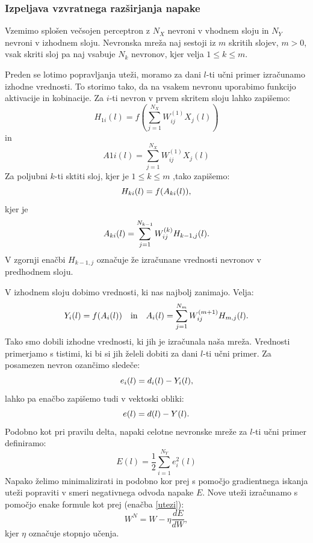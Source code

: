 \documentclass[mat1]{fmfdelo}
\begin{document}
\subsubsection{Izpeljava vzvratnega razširjanja napake}
Vzemimo splošen večsojen perceptron z $N_X$ nevroni v vhodnem sloju in $N_Y$ nevroni v izhodnem sloju. Nevronska mreža naj sestoji iz $m$ skritih slojev, $m>0$, vsak skriti sloj pa naj vsabuje $N_k$ nevronov, kjer velja $1\leq k \leq m$. 

Preden se lotimo popravljanja uteži, moramo za dani $l$-ti učni primer izračunamo izhodne vrednosti. To storimo tako, da na vsakem nevronu uporabimo funkcijo aktivacije in kobinacije. Za $i$-ti nevron v prvem skritem sloju lahko zapišemo:
%
\begin{equation*}
H_{1i}(l) = f\left( \sum^{N_X}_{j=1}{W^{(1)}_{ij}X_j(l)}\right)
\end{equation*}
%
in
%
\begin{equation*}
A{1i}(l) =\sum^{N_X}_{j=1}{W^{(1)}_{ij}X_j(l)}
\end{equation*}
%
Za poljubni $k$-ti sktiti sloj, kjer je $1\leq k \leq m$ ,tako zapišemo:
%
\begin{equation*}
H_{ki}(l) = f(A_{ki}(l))\text,
\end{equation*}
%
kjer je
%
\begin{equation*}
A_{ki}(l) = \sum^{N_{k-1}}_{j=1}W^{(k)}_{ij}H_{k-1,j}(l)\text.
\end{equation*}
%
V zgornji enačbi $H_{k-1,j}$ označuje že izračunane vrednosti nevronov v predhodnem sloju.
 
 V izhodnem sloju dobimo vrednosti, ki nas najbolj zanimajo. Velja:
%
\begin{equation*}
Y_{i}(l) = f(A_{i}(l)) \quad \text{in} \quad A_{i}(l) = \sum^{N_{m}}_{j=1}{W^{(m+1)}_{ij}H_{m,j}(l)}\text.
\end{equation*}
%
Tako smo dobili izhodne vrednosti, ki jih je izračunala naša mreža. Vrednosti primerjamo s tistimi, ki bi si jih želeli dobiti za dani $l$-ti učni primer. Za posamezen nevron ozančimo sledeče:
%
\begin{equation}
e_i(l) = d_i(l) - Y_i(l)\text,
\end{equation}
lahko pa enačbo zapišemo tudi v vektoski obliki:
\begin{equation*}
e(l) = d(l) - Y(l)\text.
\end{equation*}
Podobno kot pri pravilu delta, napaki celotne nevronske mreže za $l$-ti učni primer definiramo:
%
\begin{equation}
E(l) = \frac{1}{2}\sum^{N_Y}_{i=1}e_i^2(l)
\label{napaka}
\end{equation}
%
Napako želimo minimalizirati in podobno kor prej s pomočjo gradientnega iskanja uteži popraviti v smeri negativnega odvoda napake $E$. Nove uteži izračunamo s pomočjo enake formule kot prej (enačba \eqref{utezi}):
\begin{equation*}
W^{N} = W - \eta \frac{dE}{dW}, 
\end{equation*}
%
kjer $\eta$ označuje stopnjo učenja. 
\end{document}
